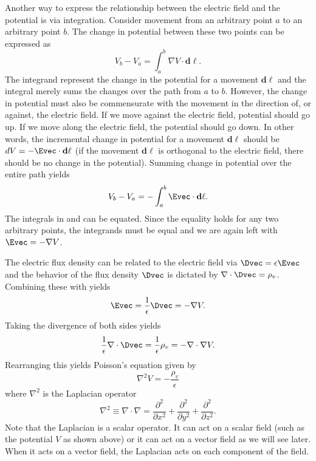 Another way to express the relationship between the electric field and
the potential is via integration.  Consider movement from an arbitrary
point $a$ to an arbitrary point $b$.  The change in potential between
these two points can be expressed as
\begin{equation}
  V_b-V_a = \int_a^b \nabla V \cdot \mathbf{d\ell}.
  \label{eq:potentialInt}
\end{equation}
The integrand represent the change in the potential for a movement
$\mathbf{d\ell}$ and the integral merely sums the changes over the
path from $a$ to $b$.  However, the change in potential must also be
commensurate with the movement in the direction of, or against, the
electric field.  If we move against the electric field, potential
should go up.  If we move along the electric field, the potential
should go down.  In other words, the incremental change in potential
for a movement $\mathbf{d\ell}$ should be
$dV=-\Evec\cdot\mathbf{d\ell}$ (if the movement $\mathbf{d\ell}$ is
orthogonal to the electric field, there should be no change in the
potential).  Summing change in potential over the entire path yields
\begin{equation}
  V_b-V_a = - \int_a^b \Evec \cdot \mathbf{d\ell}.
  \label{eq:potentialIntII}
\end{equation}
The integrals in  and 
can be equated.  Since the equality holds for any two arbitrary points,
the integrands must be equal and we are again left with $\Evec =
-\nabla V$. 

The electric flux density can be related to the electric field via
$\Dvec=\epsilon\Evec$ and the behavior of the flux density $\Dvec$ is
dictated by $\nabla\cdot\Dvec=\rho_v$.  Combining these with
 yields
\begin{equation}
  \Evec = \frac{1}{\epsilon}\Dvec = -\nabla V.
\end{equation}
Taking the divergence of both sides yields
\begin{equation}
  \frac{1}{\epsilon}\nabla\cdot\Dvec =  
  \frac{1}{\epsilon} \rho_v =
  -\nabla\cdot\nabla V.
\end{equation}
Rearranging this yields Poisson's equation given by
\begin{equation}
  \nabla^2 V = -\frac{\rho_v}{\epsilon}
  \label{eq:poisson}
\end{equation}
where $\nabla^2$ is the Laplacian operator
\begin{equation}
  \nabla^2 \equiv \nabla\cdot\nabla =
     \frac{\partial^2}{\partial x^2} +
     \frac{\partial^2}{\partial y^2} +
     \frac{\partial^2}{\partial z^2}.
\end{equation}
Note that the Laplacian is a scalar operator.  It can act on a scalar
field (such as the potential $V$ as shown above) or it can act on a
vector field as we will see later.  When it acts on a vector field,
the Laplacian acts on each component of the field.

